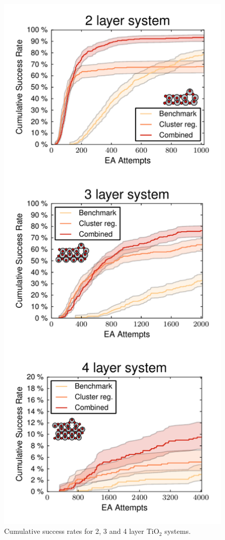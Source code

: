 \documentclass[aip,amsmath,amssymb,reprint]{revtex4-1}
\begin{document}
\begin{figure}[!hb]
    \centering
    \includegraphics[width=1.0\columnwidth]{fig7-success.pdf}
    \caption{Cumulative success rates for 2, 3 and 4 layer TiO$_2$ systems.}
    \label{fig_success}
\end{figure}
\end{document}
